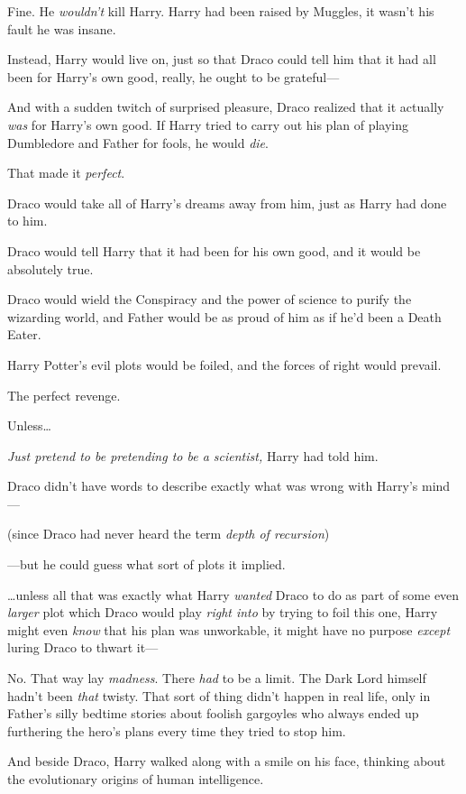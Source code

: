 Fine. He \emph{wouldn't} kill Harry. Harry had been raised by Muggles, it wasn't his fault he was insane.

Instead, Harry would live on, just so that Draco could tell him that it had all been for Harry's own good, really, he ought to be grateful—

And with a sudden twitch of surprised pleasure, Draco realized that it actually \emph{was} for Harry's own good. If Harry tried to carry out his plan of playing Dumbledore and Father for fools, he would \emph{die}.

That made it \emph{perfect}.

Draco would take all of Harry's dreams away from him, just as Harry had done to him.

Draco would tell Harry that it had been for his own good, and it would be absolutely true.

Draco would wield the Conspiracy and the power of science to purify the wizarding world, and Father would be as proud of him as if he'd been a Death Eater.

Harry Potter's evil plots would be foiled, and the forces of right would prevail.

The perfect revenge.

Unless{\ldots}

\emph{Just pretend to be pretending to be a scientist,} Harry had told him.

Draco didn't have words to describe exactly what was wrong with Harry's mind—

(since Draco had never heard the term \emph{depth of recursion})

—but he could guess what sort of plots it implied.

{\ldots}unless all that was exactly what Harry \emph{wanted} Draco to do as part of some even \emph{larger} plot which Draco would play \emph{right into} by trying to foil this one, Harry might even \emph{know} that his plan was unworkable, it might have no purpose \emph{except} luring Draco to thwart it—

No. That way lay \emph{madness}. There \emph{had} to be a limit. The Dark Lord himself hadn't been \emph{that} twisty. That sort of thing didn't happen in real life, only in Father's silly bedtime stories about foolish gargoyles who always ended up furthering the hero's plans every time they tried to stop him.

\later

And beside Draco, Harry walked along with a smile on his face, thinking about the evolutionary origins of human intelligence.

